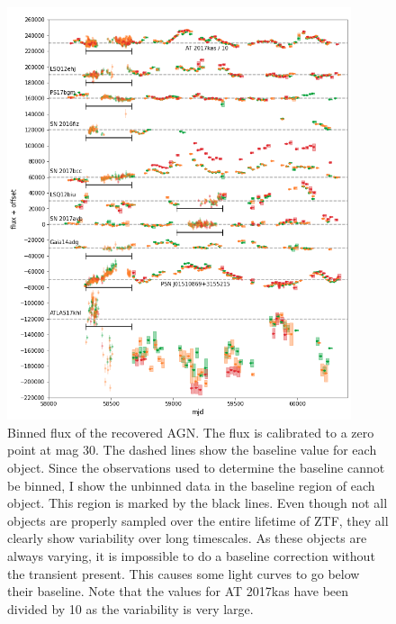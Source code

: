 \documentclass[a4paper,oneside,12pt, class=Latex/Classes/PhDthesisPSnPDF, crop=false]{standalone}
\begin{document}
\begin{figure}
    \centering
    \includegraphics[width=0.9\textwidth]{../Images/chapter_4/non-transients_AGN.png}
    \caption{Binned flux of the recovered AGN. The flux is calibrated to a zero point at mag 30. The dashed lines show the baseline value for each object. Since the observations used to determine the baseline cannot be binned, I show the unbinned data in the baseline region of each object. This region is marked by the black lines. Even though not all objects are properly sampled over the entire lifetime of ZTF, they all clearly show variability over long timescales. As these objects are always varying, it is impossible to do a baseline correction without the transient present. This causes some light curves to go below their baseline. Note that the values for AT 2017kas have been divided by 10 as the variability is very large.}
    \label{non-transients_AGN}
\end{figure}
\end{document}
